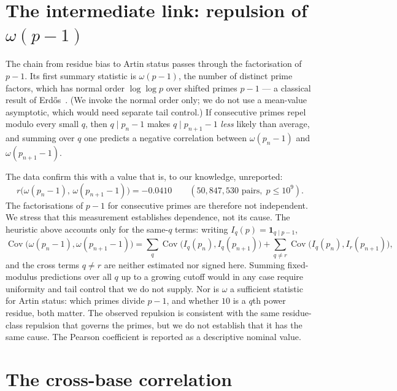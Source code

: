 \documentclass[11pt,reqno]{amsart}
\theoremstyle{plain}
\theoremstyle{definition}
\begin{document}
\section{The intermediate link: repulsion of \texorpdfstring{$\omega(p-1)$}{omega(p-1)}}
\label{sec:omega}

The chain from residue bias to Artin status passes through the factorisation
of $p - 1$. Its first summary statistic is
$\omega(p-1)$, the number of distinct prime factors, which has normal order
$\log\log p$ over shifted primes $p - 1$ --- a classical result of
Erd\H{o}s~\cite{Erdos1935}. (We invoke the normal order only; we do not use a
mean-value asymptotic, which would need separate tail control.) If consecutive primes repel modulo every small
$q$, then $q \mid p_n - 1$ makes $q \mid p_{n+1} - 1$ \emph{less} likely than
average, and summing over $q$ one predicts a negative correlation between
$\omega(p_n - 1)$ and $\omega(p_{n+1} - 1)$.

The data confirm this with a value that is, to our knowledge, unreported:
\[
	r\bigl(\omega(p_n - 1),\, \omega(p_{n+1} - 1)\bigr) = -0.0410
	\qquad (50{,}847{,}530 \text{ pairs}, \; p \le 10^9).
\]
The factorisations of $p - 1$ for consecutive primes are therefore not
independent. We stress that this measurement establishes dependence, not its
cause. The heuristic above accounts only for the same-$q$ terms: writing
$I_q(p) = \mathbf{1}_{q \mid p-1}$,
\[
  \operatorname{Cov}\bigl(\omega(p_n-1), \omega(p_{n+1}-1)\bigr)
  = \sum_q \operatorname{Cov}\bigl(I_q(p_n), I_q(p_{n+1})\bigr)
  + \sum_{q \ne r} \operatorname{Cov}\bigl(I_q(p_n), I_r(p_{n+1})\bigr),
\]
and the cross terms $q \ne r$ are neither estimated nor signed here. Summing
fixed-modulus predictions over all $q$ up to a growing cutoff would in any case
require uniformity and tail control that we do not supply. Nor is $\omega$ a
sufficient statistic for Artin status: which primes divide $p-1$, and whether
$10$ is a $q$th power residue, both matter. The observed repulsion is
consistent with the same residue-class repulsion that governs the primes, but
we do not establish that it has the same cause. The Pearson coefficient is
reported as a descriptive nominal value.




\section{The cross-base correlation}
\label{sec:measurement}
\end{document}
